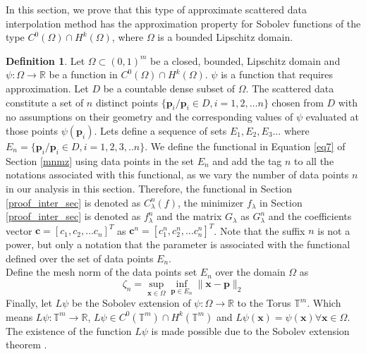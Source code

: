 \documentclass[multixcb]{amstext-l}
\theoremstyle{plain}
\theoremstyle{definition}
\theoremstyle{definition}
\newtheorem{definition}[theorem]{Definition}
\theoremstyle{remark}
\numberwithin{equation}{chapter}
\begin{document}
In this section, we prove that this type of approximate scattered data interpolation method has the approximation property for Sobolev functions of the type $C^0(\Omega )\cap H^k(\Omega)$, where $\Omega$ is a bounded Lipschitz domain. \\ %
\begin{definition}\label{theorem_defs}
Let $\Omega \subset (0,1)^m$ be a closed, bounded, Lipschitz domain and $\psi:\Omega\to\mathbb{R}$ be a function in $C^0(\Omega)\cap H^k(\Omega) $. $\psi$ is a function that requires approximation. Let $D$ be a countable dense subset of $\Omega$. The scattered data constitute a set of $n$ distinct points $\{\boldsymbol{p}_i/\boldsymbol{p}_i\in D, i=1,2,\ldots n\}$ chosen from $D$ with no assumptions on their geometry and the corresponding values of $\psi$ evaluated at those points $\psi(\boldsymbol{p}_i)$. Lets define a sequence of sets $E_1,E_2,E_3\ldots$ where $E_n = \{\boldsymbol{p}_i/\boldsymbol{p}_i\in D, i = 1,2,3,..n\}.$ We define the functional in Equation \ref{eq7} of Section \ref{mnmz} using data points in the set $E_n$ and add the tag $n$ to all the notations associated with this functional, as we vary the number of data points $n$ in our analysis in this section. Therefore, the functional in Section \ref{proof_inter_sec} is denoted as $C^n_{\lambda}(f)$, the minimizer $f_{\lambda}$ in Section \ref{proof_inter_sec} is denoted as $f^n_{\lambda}$ and the matrix $G_{\lambda}$ as $G^n_{\lambda}$ and the coefficients vector $\boldsymbol{c}=[c_1,c_2,\ldots c_n]^T$ as $\boldsymbol{c}^n=[c^n_1,c^n_2,\ldots c^n_n]^T$. Note that the suffix $n$ is not a power, but only a notation that the parameter is associated with the functional defined over the set of data points $E_n$.\\
Define the mesh norm of the data points set $E_n$ over the domain $\Omega$ as \begin{equation}\label{mesh_norm}
\zeta_n = \sup\limits_{\boldsymbol{x}\in\Omega}\inf\limits_{\boldsymbol{p}\in E_n}\|\boldsymbol{x}-\boldsymbol{p}\|_2
\end{equation}
Finally, let $L\psi$ be the Sobolev extension of $\psi:\Omega\to\mathbb{R}$ to the Torus $\mathbb{T}^m$. Which means $L\psi:\mathbb{T}^m\to\mathbb{R}$, $L\psi\in C^0(\mathbb{T}^m)\cap H^k(\mathbb{T}^m)$ and $L\psi(\boldsymbol{x}) = \psi(\boldsymbol{x})\forall \boldsymbol{x} \in \Omega$. The existence of the function $L\psi$ is made possible due to the Sobolev extension theorem \cite{evans1998partial,MR2424078}.
\end{definition}
\end{document}
